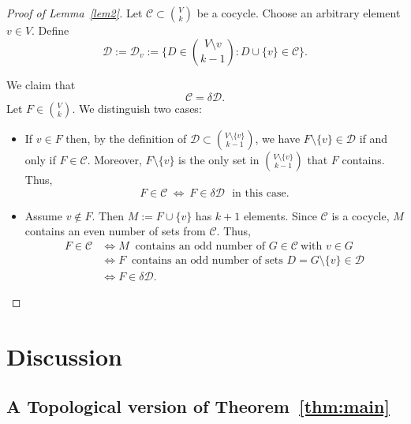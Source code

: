 \documentclass[english,a4paper,nolineno]{lipics-v2019}
\begin{document}
\begin{proof}[Proof of Lemma~\ref{lem2}] Let $\mathcal C\subset {V\choose k}$ be a cocycle. Choose an arbitrary element $v\in V$. Define 
$$\mathcal D:=\mathcal D_v:=\big\{D\in{V\setminus v\choose k-1}: D\cup \{v\}\in \mathcal C\big\}.$$
 
We claim that $$\mathcal C=\delta \mathcal D.$$%
Let $F\in {V\choose k}$. We distinguish two cases:
\begin{itemize}
  \item[1) ] If $v\in F$ then, by the definition of $\mathcal D\subset {V\setminus \{v\}\choose k-1}$, we have $F\setminus \{v\}\in \mathcal D$ if and only if $F\in \mathcal C$. Moreover, $F\setminus \{v\}$ is the only set in ${V\setminus \{v\}\choose k-1}$ that $F$ contains. Thus,
$$F\in \mathcal C\ \Leftrightarrow\ F\in \delta \mathcal D\ \ \ \text{in this case.}$$
  \item[2) ] Assume $v\notin F$. Then $M:=F\cup \{v\}$ has $k+1$ elements. Since $\mathcal C$ is a cocycle, $M$ contains an even number of sets from $\mathcal C$. Thus,
\begin{align*}
  F\in \mathcal C & \Leftrightarrow M \ \text{ contains an odd number of }G\in \mathcal C \ \text{with } v\in G \\
   & \Leftrightarrow F\ \text{ contains an odd number of sets }D=G\setminus \{v\}\in \mathcal D\\
   & \Leftrightarrow F\in \delta \mathcal D.
\end{align*}
\end{itemize}
\end{proof}

\section{Discussion}\label{sec3}
\subsection{A Topological version of Theorem~\ref{thm:main}}
\end{document}

